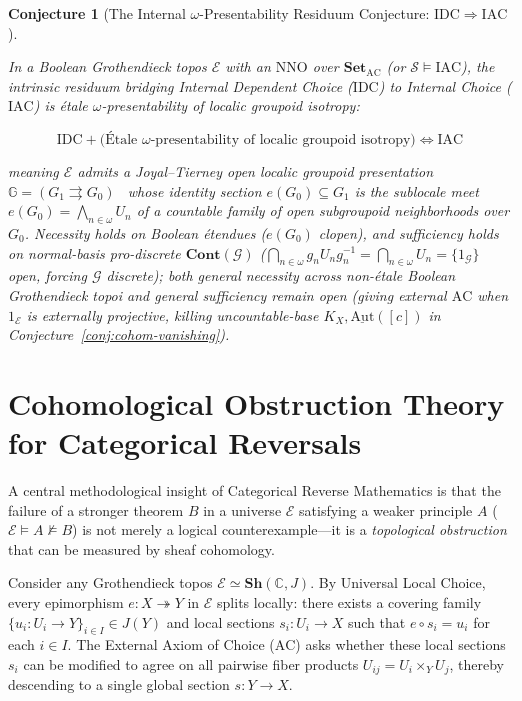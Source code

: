 \documentclass[10pt,twoside,openright]{book}
\theoremstyle{crmplain}
\newtheorem{conjecture}[theorem]{Conjecture}
\theoremstyle{crmdef}
\theoremstyle{crmremark}
\begin{document}
\begin{conjecture}[The Internal $\omega$-Presentability Residuum Conjecture: $\mathrm{IDC} \Rightarrow \mathrm{IAC}$]\label{conj:dc-ac}

In a Boolean Grothendieck topos $\mathcal{E}$ with an $\mathrm{NNO}$ over $\mathbf{Set}_{\mathrm{AC}}$ (or $\mathcal{S} \models \mathrm{IAC}$), the intrinsic residuum bridging Internal Dependent Choice ($\mathrm{IDC}$) to Internal Choice ($\mathrm{IAC}$) is \emph{\'etale $\omega$-presentability of localic groupoid isotropy}:

\[
  \mathrm{IDC} + \bigl(\text{\'Etale } \omega\text{-presentability of localic groupoid isotropy}\bigr) \iff \mathrm{IAC}
\]

meaning $\mathcal{E}$ admits a Joyal--Tierney open localic groupoid presentation $\mathbb{G} = (G_1 \rightrightarrows G_0)$~\cite[\S C5.3]{Johnstone02} whose identity section $e(G_0) \subseteq G_1$ is the sublocale meet $e(G_0) = \bigwedge_{n \in \omega} U_n$ of a countable family of open subgroupoid neighborhoods over $G_0$. Necessity holds on Boolean \'etendues ($e(G_0)$ clopen), and sufficiency holds on normal-basis pro-discrete $\mathbf{Cont}(\mathcal{G})$ ($\bigcap_{n \in \omega} g_n U_n g_n^{-1} = \bigcap_{n \in \omega} U_n = \{1_{\mathcal{G}}\}$ open, forcing $\mathcal{G}$ discrete); both general necessity across non-\'etale Boolean Grothendieck topoi and general sufficiency remain open (giving external $\mathrm{AC}$ when $1_{\mathcal{E}}$ is externally projective, killing uncountable-base $K_X, \underline{\mathrm{Aut}}([c])$ in Conjecture~\ref{conj:cohom-vanishing}).

\end{conjecture}

\section{Cohomological Obstruction Theory for Categorical Reversals}

A central methodological insight of Categorical Reverse Mathematics is that the failure of a stronger theorem $B$ in a universe $\mathcal{E}$ satisfying a weaker principle $A$ ($\mathcal{E} \models A \not\models B$) is not merely a logical counterexample---it is a \emph{topological obstruction} that can be measured by sheaf cohomology.

Consider any Grothendieck topos $\mathcal{E} \simeq \mathbf{Sh}(\mathbb{C}, J)$. By Universal Local Choice, every epimorphism $e: X \twoheadrightarrow Y$ in $\mathcal{E}$ splits locally: there exists a covering family $\{u_i: U_i \to Y\}_{i \in I} \in J(Y)$ and local sections $s_i: U_i \to X$ such that $e \circ s_i = u_i$ for each $i \in I$. The External Axiom of Choice ($\mathrm{AC}$) asks whether these local sections $s_i$ can be modified to agree on all pairwise fiber products $U_{ij} = U_i \times_Y U_j$, thereby descending to a single global section $s: Y \to X$.
\end{document}
